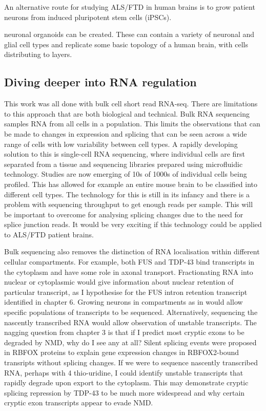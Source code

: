 An alternative route for studying ALS/FTD in human brains is to grow patient neurons from induced pluripotent stem cells (iPSCs).

 neuronal organoids can be created. 
These can contain a variety of neuronal and glial cell types and replicate some basic topology of a human brain, with cells distributing to layers.


\subsection{Diving deeper into RNA regulation}

This work was all done with bulk cell short read RNA-seq. 
There are limitations to this approach that are both biological and technical.
Bulk RNA sequencing samples RNA from all cells in a population. 
This limits the observations that can be made to changes in expression and splicing that can be seen across a wide range of cells with low variability between cell types.
A rapidly developing solution to this is single-cell RNA sequencing, where individual cells are first separated from a tissue and sequencing libraries prepared using microfluidic technology.
Studies are now emerging of 10s of 1000s of individual cells being profiled. 
This has allowed for example an entire mouse brain to be classified into different cell types. %
The technology for this is still in its infancy and there is a problem with sequencing throughput to get enough reads per sample.
This will be important to overcome for analysing splicing changes due to the need for splice junction reads.
It would be very exciting if this technology could be applied to ALS/FTD patient brains. 

Bulk sequencing also removes the distinction of RNA localisation within different cellular compartments. %
For example, both FUS and TDP-43 bind transcripts in the cytoplasm and have some role in axonal transport. %
Fractionating RNA into nuclear or cytoplasmic would give information about nuclear retention of particular transcript, as I hypothesise for the FUS intron retention transcript identified in chapter 6.
Growing neurons in compartments as in \citep{Taliaferro2016} would allow specific populations of transcripts to be sequenced.
Alternatively, sequencing the nascently transcribed RNA would allow observation of unstable transcripts.
The nagging question from chapter 3 is that if I predict most cryptic exons to be degraded by NMD, why do I see any at all?
Silent splicing events were proposed in RBFOX proteins \citep{Jangi2014} to explain gene expression changes in RBFOX2-bound transripts without splicing changes.
If we were to sequence nascently transcribed RNA, perhaps with 4 thio-uridine, I could identify unstable transcripts that rapidly degrade upon export to the cytoplasm.
This may demonstrate cryptic splicing repression by TDP-43 to be much more widespread and why certain cryptic exon transcripts appear to evade NMD.



